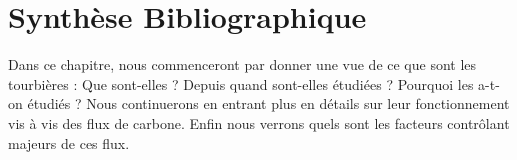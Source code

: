 
%	
%


\chapter{Synth\`{e}se Bibliographique}
\newpage


Dans ce chapitre, nous commenceront par donner une vue de ce que sont les tourbières : Que sont-elles ? Depuis quand sont-elles étudiées ? Pourquoi les a-t-on étudiés ?
Nous continuerons en entrant plus en détails sur leur fonctionnement vis à vis des flux de carbone.
Enfin nous verrons quels sont les facteurs contrôlant majeurs de ces flux.

